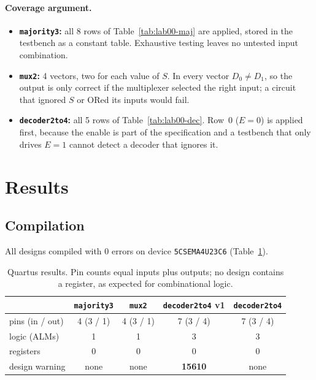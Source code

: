 \paragraph{Coverage argument.}
\begin{itemize}[leftmargin=1.5em]
\item \textbf{\texttt{majority3}:} all 8 rows of Table~\ref{tab:lab00-maj} are
applied, stored in the testbench as a constant table. Exhaustive testing leaves no
untested input combination.
\item \textbf{\texttt{mux2}:} 4 vectors, two for each value of $S$. In every vector
$D_0 \neq D_1$, so the output is only correct if the multiplexer selected the right
input; a circuit that ignored $S$ or ORed its inputs would fail.
\item \textbf{\texttt{decoder2to4}:} all 5 rows of Table~\ref{tab:lab00-dec}. Row~0
($E = 0$) is applied first, because the enable is part of the specification and a
testbench that only drives $E = 1$ cannot detect a decoder that ignores it.
\end{itemize}




\section{Results}

\subsection{Compilation}

All designs compiled with 0 errors on device \texttt{5CSEMA4U23C6}
(Table~\ref{tab:lab00-quartus}).

\begin{table}[H]
\centering
\caption{Quartus results. Pin counts equal inputs plus outputs; no design contains
a register, as expected for combinational logic.}
\label{tab:lab00-quartus}
\begin{tabular}{lcccc}
\toprule
& \texttt{majority3} & \texttt{mux2} & \texttt{decoder2to4} v1 & \texttt{decoder2to4} \\
\midrule
pins (in / out) & 4 (3 / 1) & 4 (3 / 1) & 7 (3 / 4) & 7 (3 / 4) \\
logic (ALMs)    & 1 & 1 & 3 & 3 \\
registers       & 0 & 0 & 0 & 0 \\
design warning  & none & none & \textbf{15610} & none \\
\bottomrule
\end{tabular}
\end{table}

